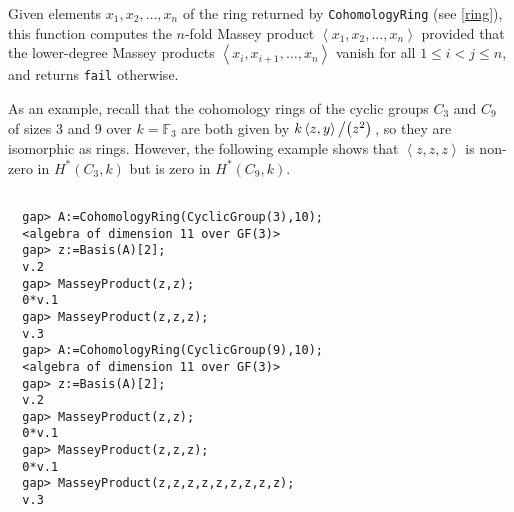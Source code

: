 \documentclass[a4paper,11pt]{report}
\begin{document}
{{{ Given elements  $x_1,x_2,\dots,x_n$  of the ring returned by \texttt{CohomologyRing} (see \ref{ring}), this function computes the $n$-fold Massey product  $\left\langle x_1,x_2,\ldots,x_n\right\rangle$  provided that the lower-degree Massey products  $\left\langle x_i,x_{i+1},\ldots,x_n\right\rangle$  vanish for all $1 \leq i < j \leq n$, and returns \texttt{fail} otherwise. }

 As an example, recall that the cohomology rings of the cyclic groups $C_3$ and $C_9$ of sizes 3 and 9 over $k=\mathbb{F}_3$  are both given by  $k\left\langle z, y\right\rangle\left/\left(z^2\right)\right.$,  so they are isomorphic as rings. However, the following example shows that  $\left\langle z,z,z\right\rangle$  is non-zero in $H^\ast\left(C_3,k\right)$  but is zero in $H^\ast\left(C_9,k\right)$.  
\begin{Verbatim}[fontsize=\small,frame=single,label=Example]
  
  gap> A:=CohomologyRing(CyclicGroup(3),10);
  <algebra of dimension 11 over GF(3)>
  gap> z:=Basis(A)[2];
  v.2
  gap> MasseyProduct(z,z);
  0*v.1
  gap> MasseyProduct(z,z,z);
  v.3
  gap> A:=CohomologyRing(CyclicGroup(9),10);
  <algebra of dimension 11 over GF(3)>
  gap> z:=Basis(A)[2];
  v.2
  gap> MasseyProduct(z,z);
  0*v.1
  gap> MasseyProduct(z,z,z);
  0*v.1
  gap> MasseyProduct(z,z,z,z,z,z,z,z,z);
  v.3
  
\end{Verbatim}
 }

 }

 

\appendix
\end{document}
